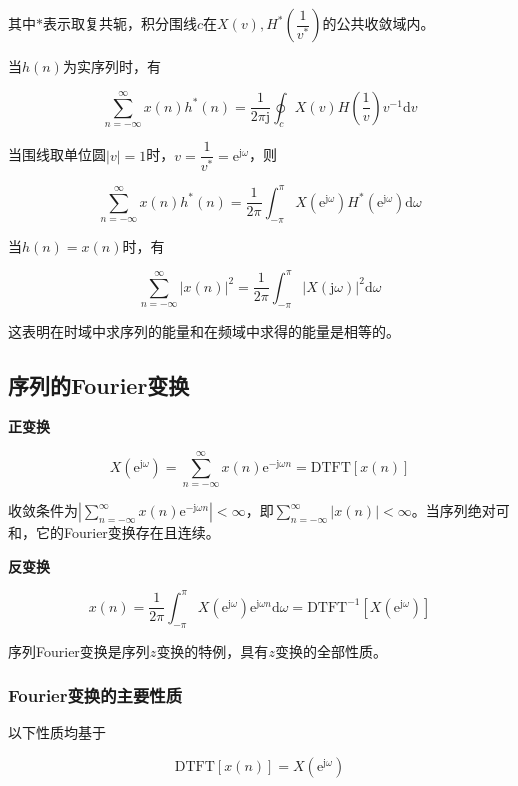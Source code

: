 \documentclass[cn, hazy, blue, normal, 12pt]{elegantnote}
\begin{document}
其中$*$表示取复共轭，积分围线$c$在$X(v), H^*\left(\dfrac{1}{v^*}\right)$的公共收敛域内。

当$h(n)$为实序列时，有

$$\sum_{n=-\infty}^{\infty}{x(n)h^*(n)}=\frac{1}{2\pi\text{j}}\oint_{c}{X(v)H\left(\frac{1}{v}\right)v^{-1}\text{d}v}$$

当围线取单位圆$|v|=1$时，$v=\dfrac{1}{v^*}=\text{e}^{\text{j}\omega}$，则

$$\sum_{n=-\infty}^{\infty}{x(n)h^*(n)}=\frac{1}{2\pi}\int_{-\pi}^{\pi}{X(\text{e}^{\text{j}\omega})H^*(\text{e}^{\text{j}\omega})\text{d}\omega}$$

当$h(n)=x(n)$时，有

$$\sum_{n=-\infty}^{\infty}{|x(n)|^2}=\frac{1}{2\pi}\int_{-\pi}^{\pi}{\left|X(\text{j}\omega)\right|^2\text{d}\omega}$$

这表明在时域中求序列的能量和在频域中求得的能量是相等的。

\subsection{序列的Fourier变换}

\textbf{正变换}

\begin{equation}
        X(\text{e}^{\text{j}\omega})=\sum_{n=-\infty}^{\infty}{x(n)\text{e}^{-\text{j}\omega n}}=\text{DTFT}[x(n)]
\end{equation}

收敛条件为$\left|\sum\limits_{n=-\infty}^{\infty}{x(n)\text{e}^{-\text{j}\omega n}}\right|<\infty$，即$\sum\limits_{n=-\infty}^{\infty}{\left|x(n)\right|}<\infty$。当序列绝对可和，它的Fourier变换存在且连续。

\textbf{反变换}

\begin{equation}
        x(n)=\frac{1}{2\pi}\int_{-\pi}^{\pi}X(\text{e}^{\text{j}\omega})\text{e}^{\text{j}\omega n}\text{d}\omega=\text{DTFT}^{-1}[X(\text{e}^{\text{j}\omega})]
\end{equation}

序列Fourier变换是序列$z$变换的特例，具有$z$变换的全部性质。

\subsubsection{Fourier变换的主要性质}

以下性质均基于

$$\text{DTFT}[x(n)]=X(\text{e}^{\text{j}\omega})$$
\end{document}

